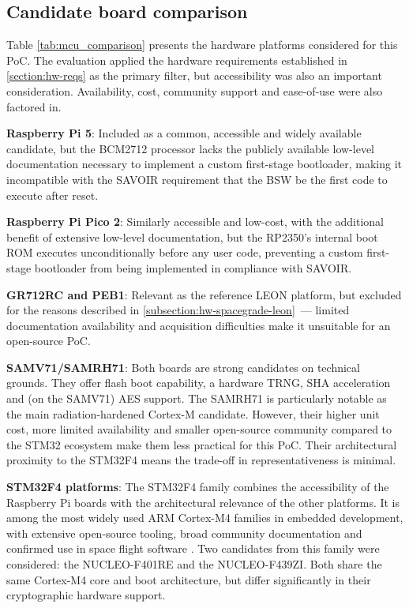 \subsection{Candidate board comparison}
\label{subsection:hw-selection-candidates}

Table \ref{tab:mcu_comparison} presents the hardware platforms considered for this PoC. The evaluation applied the hardware requirements established in \autoref{section:hw-reqs} as the primary filter, but accessibility was also an important consideration. Availability, cost, community support and ease-of-use were also factored in.

\textbf{Raspberry Pi 5}: Included as a common, accessible and widely available candidate, but the BCM2712  processor lacks the publicly available low-level documentation necessary to implement a custom first-stage bootloader, making it incompatible with the SAVOIR requirement that the BSW be the first code to execute after reset.

\textbf{Raspberry Pi Pico 2}: Similarly accessible and low-cost, with the additional benefit of extensive low-level documentation, but the RP2350's internal boot ROM executes unconditionally before any user code, preventing a custom first-stage bootloader from  being implemented in compliance with SAVOIR.

\textbf{GR712RC and PEB1}: Relevant as the reference LEON platform, but excluded for the reasons described in \autoref{subsection:hw-spacegrade-leon}~--- limited documentation availability and acquisition difficulties make it unsuitable for an open-source PoC.

\textbf{SAMV71/SAMRH71}: Both boards are strong candidates on technical grounds. They offer flash boot capability, a hardware TRNG, SHA acceleration and (on the SAMV71) AES support. The SAMRH71 is particularly notable as the main radiation-hardened Cortex-M candidate. However, their higher unit cost, more limited availability and smaller open-source community compared to the STM32 ecosystem make them less practical for this PoC. Their architectural proximity to the STM32F4 means the trade-off in representativeness is minimal.

\textbf{STM32F4 platforms}: The STM32F4 family combines the accessibility of the Raspberry Pi boards with the architectural relevance of the other platforms. It is among the most widely used ARM Cortex-M4 families in embedded development, with extensive open-source tooling, broad community documentation and confirmed use in space flight software \cite{space_odyssey_2023, cubesat_fsw_design, cubesat_fsw_development, cubesat_flight_software}. Two candidates from this family were considered: the NUCLEO-F401RE and the NUCLEO-F439ZI. Both share the same Cortex-M4 core and boot architecture, but differ significantly in their cryptographic hardware support.

